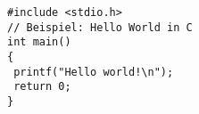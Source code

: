 \documentclass[12pt,a5paper]{scrbook}
\begin{document}
	
\begin{lstlisting}[caption={Hello World in C}, label=lst:hello-world,emph={main}]
#include <stdio.h>
// Beispiel: Hello World in C
int main()
{
 printf("Hello world!\n");
 return 0;
}
\end{lstlisting}
\end{document}
